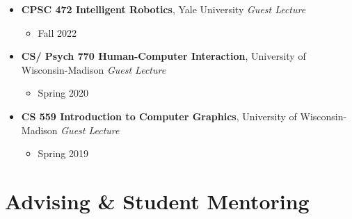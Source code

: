 \documentclass[11pt, letterpaper]{article}
\begin{document}
\begin{itemize}[leftmargin=0pt, label={}, itemsep=0.5em]
\begin{itemize}[leftmargin=1.5em, label={--}, topsep=2pt, partopsep=0pt, itemsep=0pt, parsep=0pt]
                            \item Fall 2022. Course Rating: 4.8/5.0
                        \end{itemize}
            \vspace{0.5em}
                \item \textbf{CPSC 472 Intelligent Robotics}, Yale University \hfill \textit{Guest Lecture}                            \begin{itemize}[leftmargin=1.5em, label={--}, topsep=2pt, partopsep=0pt, itemsep=0pt, parsep=0pt]
                            \item Fall 2022
                        \end{itemize}
            \vspace{0.5em}
                \item \textbf{CS/ Psych 770 Human-Computer Interaction}, University of Wisconsin-Madison \hfill \textit{Guest Lecture}                            \begin{itemize}[leftmargin=1.5em, label={--}, topsep=2pt, partopsep=0pt, itemsep=0pt, parsep=0pt]
                            \item Spring 2020
                        \end{itemize}
            \vspace{0.5em}
                \item \textbf{CS 559 Introduction to Computer Graphics}, University of Wisconsin-Madison \hfill \textit{Guest Lecture}                            \begin{itemize}[leftmargin=1.5em, label={--}, topsep=2pt, partopsep=0pt, itemsep=0pt, parsep=0pt]
                            \item Spring 2019
                        \end{itemize}
            \vspace{0.5em}
            \end{itemize}

\section*{Advising \& Student Mentoring}
\end{document}
